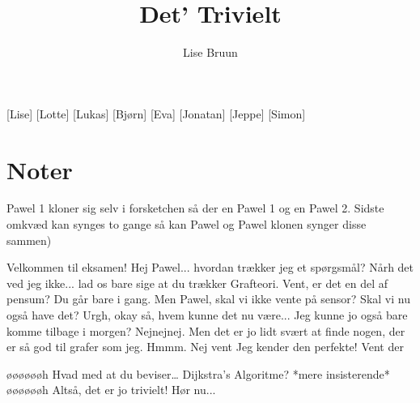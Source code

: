 \documentclass[a4paper,11pt]{article}
\title{Det' Trivielt}
\author{Lise Bruun}
\begin{document}
\maketitle

\begin{roles}
[Lise] 
[Lotte]
[Lukas]
[Bjørn]
[Eva]
[Jonatan]
[Jeppe]
[Simon]



\end{roles} 

\section*{Noter}
Pawel 1 kloner sig selv i forsketchen så der en Pawel 1 og en Pawel 2.
Sidste omkvæd kan synges to gange så kan Pawel og Pawel klonen synger disse sammen)

\begin{props}
\prop{}
\prop{}
\prop{}
\end{props}

\begin{sketch}
 Velkommen til eksamen!
 Hej Pawel... hvordan trækker jeg et spørgsmål?
 Nårh det ved jeg ikke... lad os bare sige at du trækker Grafteori.
 Vent, er det en del af pensum? 
 Du går bare i gang.
 Men Pawel, skal vi ikke vente på sensor?
 Skal vi nu også have det? Urgh, okay så, hvem kunne det nu være...
 Jeg kunne jo også bare komme tilbage i morgen?
 Nejnejnej. Men det er jo lidt svært at finde nogen, der er så god til grafer som jeg. Hmmm. Nej vent
 Jeg kender den perfekte! Vent der


 øøøøøøh
 Hvad med at du beviser… Dijkstra’s Algoritme?
 *mere insisterende* øøøøøøh
 Altså, det er jo trivielt! Hør nu...

\end{sketch}
\end{document}
